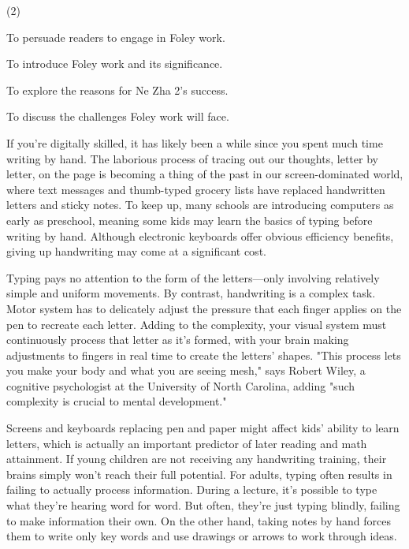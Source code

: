\documentclass{英语试卷}
\begin{document}
\begin{choices}(2)
  \item To persuade readers to engage in Foley work.
  \item To introduce Foley work and its significance.
  \item To explore the reasons for Ne Zha 2's success.
  \item To discuss the challenges Foley work will face.
\end{choices}
\par If you're digitally skilled, it has likely been a while since you spent much time writing by hand. The laborious process of tracing out our thoughts, letter by letter, on the page is becoming a thing of the past in our screen-dominated world, where text messages and thumb-typed grocery lists have replaced handwritten letters and sticky notes. To keep up, many schools are introducing computers as early as preschool, meaning some kids may learn the basics of typing before writing by hand. Although electronic keyboards offer obvious efficiency benefits, giving up handwriting may come at a significant cost.\par
\par Typing pays no attention to the form of the letters—only involving relatively simple and uniform movements. By contrast, handwriting is a complex task. Motor system has to delicately adjust the pressure that each finger applies on the pen to recreate each letter. Adding to the complexity, your visual system must continuously process that letter as it's formed, with your brain making adjustments to fingers in real time to create the letters' shapes. "This process lets you make your body and what you are seeing mesh," says Robert Wiley, a cognitive psychologist at the University of North Carolina, adding "such complexity is crucial to mental development."\par
\par Screens and keyboards replacing pen and paper might affect kids' ability to learn letters, which is actually an important predictor of later reading and math attainment. If young children are not receiving any handwriting training, their brains simply won't reach their full potential. For adults, typing often results in failing to actually process information. During a lecture, it's possible to type what they're hearing word for word. But often, they're just typing blindly, failing to make information their own. On the other hand, taking notes by hand forces them to write only key words and use drawings or arrows to work through ideas.\par
\end{document}
